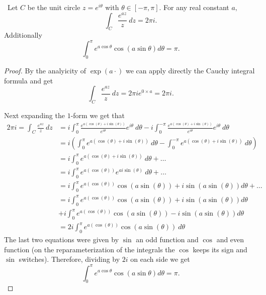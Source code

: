 \documentclass[11pt]{amsart}
\theoremstyle{definition}
\numberwithin{theorem}{section}
\numberwithin{definition}{section}
\numberwithin{equation}{section}
\begin{document}
\medskip {}\ Let $C$ be the unit circle $z = e^{i\theta}$ with $\theta \in [-\pi, \pi]$. For any real
constant $a,$
\begin{equation*}
	\int_C \frac{e^{az}}{z}\ dz = 2\pi i.
\end{equation*}
Additionally
\begin{equation*}
	\int_0^\pi e^{a \cos \theta} \cos(a \sin \theta) d\theta = \pi.
\end{equation*}
\begin{proof}
	By the analyicity of $\exp(a \cdot)$ we can apply directly the Cauchy integral formula and get
	\begin{equation*}
		\int_C \frac{e^{az}}{z}\ dz = 2\pi i e^{0\times a} = 2 \pi i.
	\end{equation*}

	Next expanding the $1$-form we get that
 	\begin{equation*}
 	\begin{aligned}
		2\pi i = \int_C \frac{e^{az}}{z}\ dz  &= i\int_0^\pi \frac{e^{a(\cos(\theta) + i \sin(\theta))}}{e^{i\theta}} e^{i\theta}\ d\theta - i\int_0^{-\pi} \frac{e^{a(\cos(\theta) + i \sin(\theta))}}{e^{i\theta}} e^{i\theta}\ d\theta  \\
		&= 	i\left(\int_0^\pi e^{a(\cos(\theta) + i \sin(\theta))}\ d\theta -  \int_0^{-\pi} e^{a(\cos(\theta) + i \sin(\theta))}\ d\theta\right) \\
		&= 	i\int_0^\pi e^{a(\cos(\theta) + i \sin(\theta))}\ d\theta  +  \dots \\
		&= i \int_0^\pi e^{a(\cos(\theta))} e^{ai\sin(\theta)}\ d\theta + \dots\\
		&= i \int_0^\pi e^{a(\cos(\theta))} \cos(a\sin(\theta)) + i\sin(a\sin(\theta)) d\theta + \dots \\
		&= i \int_0^\pi e^{a(\cos(\theta))} \cos(a\sin(\theta)) + i\sin(a\sin(\theta)) d\theta \\ 
		&+ i \int_0^\pi e^{a(\cos(\theta))} \cos(a\sin(\theta)) - i\sin(a\sin(\theta)) d\theta \\
		&= 2i \int_0^\pi e^{a(\cos(\theta))} \cos(a\sin(\theta))\ d\theta
 	\end{aligned}
	\end{equation*}
	The last two equations were given by $\sin$ an odd function and $\cos$ and even function (on the reparameterization of the integrals the $\cos$ keeps its sign and $\sin$ switches). 
	Therefore, dividing by $2i$ on each side we get
	\begin{equation*}
		\int_0^\pi e^{a \cos \theta} \cos(a \sin \theta) d\theta = \pi.
	\end{equation*}
\end{proof}
\end{document}
